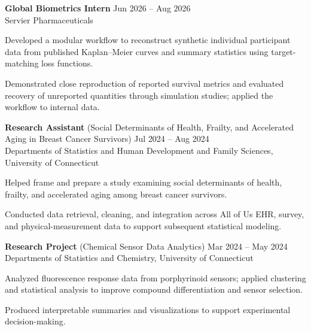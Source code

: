 \documentclass[a4paper,10pt]{article}
\newcommand{\majoritemsep}{\vspace{5pt}}
\newenvironment{reslist}[1][0pt]{%
  \begin{list}{}{%
    \setlength{\leftmargin}{0pt}%
    \setlength{\rightmargin}{0pt}%
    \setlength{\labelwidth}{0pt}%
    \setlength{\labelsep}{0pt}%
    \setlength{\itemindent}{0pt}%
    \setlength{\listparindent}{0pt}%
    \setlength{\itemsep}{#1}%
    \setlength{\topsep}{0pt}%
    \setlength{\parsep}{0pt}%
    \setlength{\partopsep}{0pt}%
  }%
}{\end{list}}
\newenvironment{bulletlist}[1][0pt]{%
  \begin{list}{\textbullet}{%
    \setlength{\leftmargin}{14pt}%
    \setlength{\rightmargin}{0pt}%
    \setlength{\labelwidth}{8pt}%
    \setlength{\labelsep}{6pt}%
    \setlength{\itemindent}{0pt}%
    \setlength{\listparindent}{0pt}%
    \setlength{\itemsep}{#1}%
    \setlength{\topsep}{2pt}%
    \setlength{\parsep}{0pt}%
    \setlength{\partopsep}{0pt}%
  }%
}{\end{list}}
\begin{document}
\begin{reslist}[1pt]
  \item \textbf{Global Biometrics Intern} \hfill Jun 2026 -- Aug 2026 \\
  Servier Pharmaceuticals
  \begin{bulletlist}[0pt]
    \item Developed a modular workflow to reconstruct synthetic individual participant data from published Kaplan--Meier curves and summary statistics using target-matching loss functions.
    \item Demonstrated close reproduction of reported survival metrics and evaluated recovery of unreported quantities through simulation studies; applied the workflow to internal data.
  \end{bulletlist}
  \majoritemsep

  \item \textbf{Research Assistant} (Social Determinants of Health, Frailty, and Accelerated Aging in Breast Cancer Survivors) \hfill Jul 2024 -- Aug 2024 \\
  Departments of Statistics and Human Development and Family Sciences, University of Connecticut
  \begin{bulletlist}[0pt]
    \item Helped frame and prepare a study examining social determinants of health, frailty, and accelerated aging among breast cancer survivors.
    \item Conducted data retrieval, cleaning, and integration across All of Us EHR, survey, and physical-measurement data to support subsequent statistical modeling.
  \end{bulletlist}
  \majoritemsep

  \item \textbf{Research Project} (Chemical Sensor Data Analytics) \hfill Mar 2024 -- May 2024 \\
  Departments of Statistics and Chemistry, University of Connecticut
  \begin{bulletlist}[0pt]
    \item Analyzed fluorescence response data from porphyrinoid sensors; applied clustering and statistical analysis to improve compound differentiation and sensor selection.
    \item Produced interpretable summaries and visualizations to support experimental decision-making.
  \end{bulletlist}
  \majoritemsep


\end{reslist}
\end{document}
